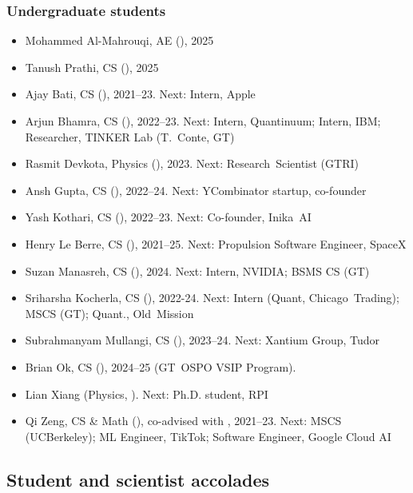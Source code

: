 \subsubsection{Undergraduate students}

\begin{itemize}
    \item Mohammed Al-Mahrouqi, AE (\GT), 2025
    \item Tanush Prathi, CS (\GT), 2025
    \item Ajay Bati, CS (\GT), 2021--23. Next: Intern, Apple
    \item Arjun Bhamra, CS (\GT), 2022--23. Next: Intern, Quantinuum; Intern, IBM; Researcher, TINKER Lab (T.~Conte, GT)
    \item Rasmit Devkota, Physics (\GT), 2023. Next: Research~Scientist (GTRI)
    \item Ansh Gupta, CS (\GT), 2022--24. Next: YCombinator startup, co-founder
    \item Yash Kothari, CS (\GT), 2022--23. Next: Co-founder, Inika~AI
    \item Henry Le Berre, CS (\GT), 2021--25. Next: Propulsion Software Engineer, SpaceX
    \item Suzan Manasreh, CS (\GT), 2024. Next: Intern, NVIDIA; BSMS CS (GT)
    \item Sriharsha Kocherla, CS (\GT), 2022-24. Next: Intern (Quant, Chicago~Trading); MSCS (GT); Quant., Old~Mission
    \item Subrahmanyam Mullangi, CS (\GT), 2023--24. Next: Xantium Group, Tudor
    \item Brian Ok, CS (\GT), 2024--25 (GT~OSPO VSIP Program).
    \item Lian Xiang (Physics, \GT). Next: Ph.D. student, RPI
    \item Qi Zeng, CS \& Math (\GT), co-advised with \Florian, 2021--23. Next: MSCS (UCBerkeley); ML Engineer, TikTok; Software Engineer, Google Cloud AI
\end{itemize}

\subsection{Student and scientist accolades}

